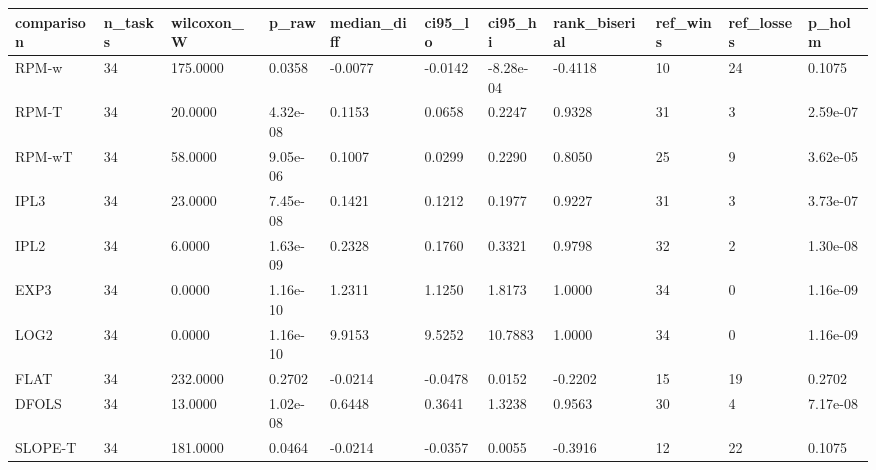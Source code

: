 \begin{tabular}{lllllllllll}
\hline
comparison & n\_tasks & wilcoxon\_W & p\_raw & median\_diff & ci95\_lo & ci95\_hi & rank\_biserial & ref\_wins & ref\_losses & p\_holm \\
\hline
RPM-w & 34 & 175.0000 & 0.0358 & -0.0077 & -0.0142 & -8.28e-04 & -0.4118 & 10 & 24 & 0.1075 \\
RPM-T & 34 & 20.0000 & 4.32e-08 & 0.1153 & 0.0658 & 0.2247 & 0.9328 & 31 & 3 & 2.59e-07 \\
RPM-wT & 34 & 58.0000 & 9.05e-06 & 0.1007 & 0.0299 & 0.2290 & 0.8050 & 25 & 9 & 3.62e-05 \\
IPL3 & 34 & 23.0000 & 7.45e-08 & 0.1421 & 0.1212 & 0.1977 & 0.9227 & 31 & 3 & 3.73e-07 \\
IPL2 & 34 & 6.0000 & 1.63e-09 & 0.2328 & 0.1760 & 0.3321 & 0.9798 & 32 & 2 & 1.30e-08 \\
EXP3 & 34 & 0.0000 & 1.16e-10 & 1.2311 & 1.1250 & 1.8173 & 1.0000 & 34 & 0 & 1.16e-09 \\
LOG2 & 34 & 0.0000 & 1.16e-10 & 9.9153 & 9.5252 & 10.7883 & 1.0000 & 34 & 0 & 1.16e-09 \\
FLAT & 34 & 232.0000 & 0.2702 & -0.0214 & -0.0478 & 0.0152 & -0.2202 & 15 & 19 & 0.2702 \\
DFOLS & 34 & 13.0000 & 1.02e-08 & 0.6448 & 0.3641 & 1.3238 & 0.9563 & 30 & 4 & 7.17e-08 \\
SLOPE-T & 34 & 181.0000 & 0.0464 & -0.0214 & -0.0357 & 0.0055 & -0.3916 & 12 & 22 & 0.1075 \\
\hline
\end{tabular}
